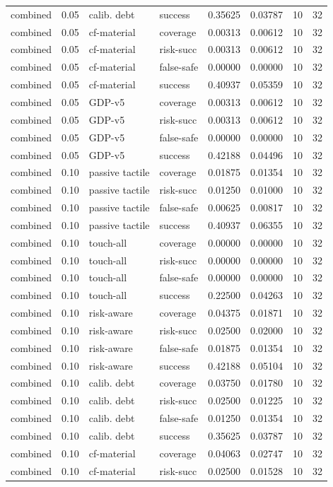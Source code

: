 \documentclass{article}
\begin{document}
\begin{center}
\begin{longtable}{llllllll}
combined & 0.05 & calib. debt & success & 0.35625 & 0.03787 & 10 & 32 \\
combined & 0.05 & cf-material & coverage & 0.00313 & 0.00612 & 10 & 32 \\
combined & 0.05 & cf-material & risk-succ & 0.00313 & 0.00612 & 10 & 32 \\
combined & 0.05 & cf-material & false-safe & 0.00000 & 0.00000 & 10 & 32 \\
combined & 0.05 & cf-material & success & 0.40937 & 0.05359 & 10 & 32 \\
combined & 0.05 & GDP-v5 & coverage & 0.00313 & 0.00612 & 10 & 32 \\
combined & 0.05 & GDP-v5 & risk-succ & 0.00313 & 0.00612 & 10 & 32 \\
combined & 0.05 & GDP-v5 & false-safe & 0.00000 & 0.00000 & 10 & 32 \\
combined & 0.05 & GDP-v5 & success & 0.42188 & 0.04496 & 10 & 32 \\
combined & 0.10 & passive tactile & coverage & 0.01875 & 0.01354 & 10 & 32 \\
combined & 0.10 & passive tactile & risk-succ & 0.01250 & 0.01000 & 10 & 32 \\
combined & 0.10 & passive tactile & false-safe & 0.00625 & 0.00817 & 10 & 32 \\
combined & 0.10 & passive tactile & success & 0.40937 & 0.06355 & 10 & 32 \\
combined & 0.10 & touch-all & coverage & 0.00000 & 0.00000 & 10 & 32 \\
combined & 0.10 & touch-all & risk-succ & 0.00000 & 0.00000 & 10 & 32 \\
combined & 0.10 & touch-all & false-safe & 0.00000 & 0.00000 & 10 & 32 \\
combined & 0.10 & touch-all & success & 0.22500 & 0.04263 & 10 & 32 \\
combined & 0.10 & risk-aware & coverage & 0.04375 & 0.01871 & 10 & 32 \\
combined & 0.10 & risk-aware & risk-succ & 0.02500 & 0.02000 & 10 & 32 \\
combined & 0.10 & risk-aware & false-safe & 0.01875 & 0.01354 & 10 & 32 \\
combined & 0.10 & risk-aware & success & 0.42188 & 0.05104 & 10 & 32 \\
combined & 0.10 & calib. debt & coverage & 0.03750 & 0.01780 & 10 & 32 \\
combined & 0.10 & calib. debt & risk-succ & 0.02500 & 0.01225 & 10 & 32 \\
combined & 0.10 & calib. debt & false-safe & 0.01250 & 0.01354 & 10 & 32 \\
combined & 0.10 & calib. debt & success & 0.35625 & 0.03787 & 10 & 32 \\
combined & 0.10 & cf-material & coverage & 0.04063 & 0.02747 & 10 & 32 \\
combined & 0.10 & cf-material & risk-succ & 0.02500 & 0.01528 & 10 & 32 \\
\bottomrule
\end{longtable}
\renewcommand{\arraystretch}{1.0}
\end{center}
\end{document}
